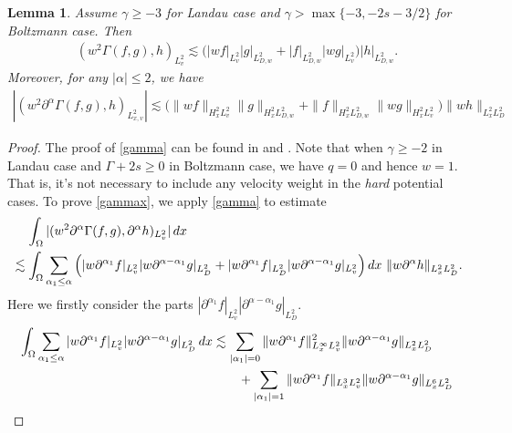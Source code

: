 \documentclass[reqno,a4paper]{amsart}
\newtheorem{Lem}[Thm]{Lemma}
\numberwithin{equation}{section}
\newcommand{\1}{\mathbf{1}}
\newcommand{\<}{\langle}
\renewcommand{\>}{\rangle}
\begin{document}
\begin{Lem}\label{gam}
Assume $\gamma\ge -3$ for Landau case and $\gamma>\max\{-3,-2s-3/2\}$ for Boltzmann case. Then
\begin{align}
	\label{gamma}
	(w^2\Gamma(f,g),h)_{L^2_v}\lesssim \Big(|wf|_{L^2_v}|g|_{L^2_{D,w}}+|f|_{L^2_{D,w}}|wg|_{L^2_v}\Big)|h|_{L^2_{D,w}}. 
\end{align}
Moreover, for any $|\alpha|\le 2$, we have 
\begin{align}\label{gammax}
	|(w^2{\partial^\alpha\Gamma(f,g)}, h)_{L^2_{x,v}}|\lesssim \Big(\|{wf}\|_{H^2_xL^2_v}\|{g}\|_{H^2_xL^2_{D,w}}+\|{f}\|_{H^2_xL^2_{D,w}}\|{wg}\|_{H^2_xL^2_{v}}\Big)\| {wh}\|_{L^2_xL^2_{D}}
\end{align}
\end{Lem}
\begin{proof}
	The proof of \eqref{gamma} can be found in \cite[Theorem 3; Lemma 10]{Guo2002a, Strain2007} and \cite[ Lemma 2.3; Lemma 2.4; (6.6)]{Gressman2011, Duan2013a, Fan2017}. 
Note that when $\gamma\ge -2$ in Landau case and $\Gamma+2s\ge 0$ in Boltzmann case, we have $q=0$ and hence $w=1$. That is, it's not necessary to include any velocity weight in the {\em hard} potential cases. 
To prove \eqref{gammax}, we apply \eqref{gamma} to estimate 
	\begin{align}\label{1.9}\notag
		&\quad\,\int_{\Omega}|({w^2\partial^\alpha\Gamma(f,g)},\partial^\alpha h)_{L^2_{v}}|\,dx\\
		&\lesssim \int_{\Omega}\sum_{\alpha_1\le\alpha}\Big(|{w\partial^{\alpha_1} f}|_{L^2_v}|{w\partial^{\alpha-\alpha_1} g}|_{L^2_{D}}+|{w\partial^{\alpha_1} f}|_{L^2_D}|{w\partial^{\alpha-\alpha_1} g}|_{L^2_{v}}\Big)\,dx\ \|w\partial^\alpha h\|_{L^2_xL^2_D}.
	\end{align}
Here we firstly consider the parts $|{\partial^{\alpha_1} f}|_{L^2_v}|{\partial^{\alpha-\alpha_1} g}|_{L^2_{D}}$. 
\begin{align*}
	\int_{\Omega}\sum_{\alpha_1\le\alpha}|w{\partial^{\alpha_1} f}|_{L^2_v}|w{\partial^{\alpha-\alpha_1} g}|_{L^2_{D}}\,dx
		&\notag\lesssim \sum_{|\alpha_1|=0}\|w{\partial^{\alpha_1} f}\|^2_{L^\infty_xL^2_v}\|w{\partial^{\alpha-\alpha_1} g}\|_{L^2_xL^2_{D}}\\
		&\notag\qquad+\sum_{|\alpha_1|=1}\|w{\partial^{\alpha_1} f}\|_{L^3_xL^2_v}\|w{\partial^{\alpha-\alpha_1} g}\|_{L^6_xL^2_{D}}\\

\end{align*}
\end{proof}
\end{document}
